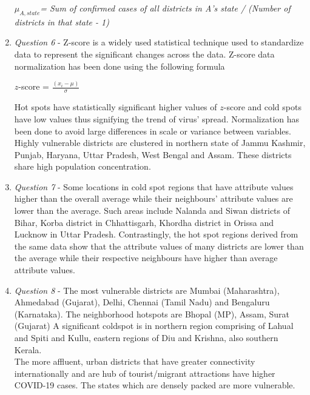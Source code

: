 \documentclass[11pt]{article}
\begin{document}
\begin{enumerate}
\begin{center}
\textit{$ \mu_{A,state} $= Sum of confirmed cases of all districts in A's state  / (Number of districts in that state - 1)}

\end{center}
\item \textit{Question 6} -  Z-score is a widely used statistical technique used to standardize data to represent the significant changes across the data. Z-score data normalization has been done using the following formula 
\begin{center}
$z$-score = $ \frac{(x_{i} - \mu) }{\sigma} $
\end{center}
Hot spots have statistically significant higher values of $z$-score and cold spots have low values thus signifying the trend of virus' spread.
Normalization has been done to avoid large differences in scale or variance between variables.\\
Highly vulnerable districts are clustered in northern state of Jammu Kashmir, Punjab, Haryana, Uttar Pradesh, West Bengal and Assam. These districts share high population concentration.

\item \textit{Question 7} - Some locations in cold spot regions that have attribute values higher than the overall average while their neighbours' attribute values are lower than the average. Such areas include Nalanda and Siwan districts of Bihar, Korba district in Chhattisgarh, Khordha district in Orissa and Lucknow in Uttar Pradesh. Contrastingly, the hot spot regions derived from the same data show that the attribute values of many districts are lower than the average while their respective neighbours have higher than average attribute values.
 
\item \textit{Question 8} - The most vulnerable districts are Mumbai (Maharashtra), Ahmedabad (Gujarat), Delhi, Chennai (Tamil Nadu) and Bengaluru (Karnataka). The neighborhood hotspots are Bhopal (MP), Assam, Surat (Gujarat)
A significant coldspot is in northern region comprising of Lahual and Spiti and Kullu, eastern regions of Diu and Krishna, also southern Kerala.\\
The more affluent, urban districts that have greater connectivity internationally and are hub of tourist/migrant attractions have higher COVID-19 cases. The states which are densely packed are more vulnerable.

\begin{flushleft}


\end{flushleft}
\end{enumerate}
\end{document}
